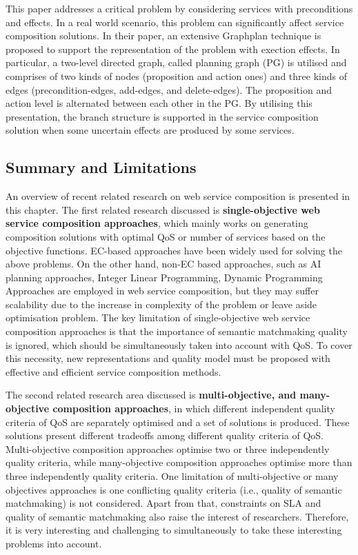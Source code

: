 This paper \cite{wang2016automatic}  addresses a critical problem by considering services with preconditions and effects. In a real world scenario, this problem can significantly affect service composition solutions.  In their paper, an extensive Graphplan technique is proposed to support the representation of the problem with exection effects. In particular, a two-level directed graph, called planning graph (PG) is utilised and comprises of two kinds of nodes (proposition and action ones) and three kinds of edges (precondition-edges, add-edges, and delete-edges). The proposition and action level is alternated between each other in the PG.  By utilising this presentation, the branch structure is supported in the service composition solution when some uncertain effects are produced by some services. 

\subsection{Summary and Limitations}\label{summary}

An overview of recent related research on web service composition is presented in this chapter. The first related research discussed is \textbf{single-objective web service composition approaches}, which mainly works on generating composition solutions with optimal QoS or number of services based on the objective functions. EC-based approaches have been widely used for solving the above problems.  On the other hand, non-EC based approaches, such as AI planning approaches, Integer Linear Programming, Dynamic Programming Approaches are employed in web service composition, but they may suffer scalability due to the increase in complexity of the problem or leave aside optimisation problem. The key limitation of single-objective web service composition approaches is that the importance of semantic matchmaking quality is ignored, which should be simultaneously taken into account with QoS. To cover this necessity, new representations and quality model must be proposed with effective and efficient service composition methods.

The second related research area discussed is \textbf{multi-objective, and many-objective composition approaches}, in which different independent quality criteria of QoS are separately optimised and a set of solutions is produced.  These solutions present different tradeoffs among different quality criteria of QoS. Multi-objective composition approaches optimise two or three independently quality criteria, while many-objective composition approaches optimise more than three independently quality criteria. One limitation of multi-objective or many objectives approaches is one conflicting quality criteria (i.e., quality of semantic matchmaking) is not considered. Apart from that,  constraints on SLA and quality of semantic matchmaking also raise the interest of researchers. Therefore, it is very interesting and challenging to simultaneously to take these interesting problems into account.

